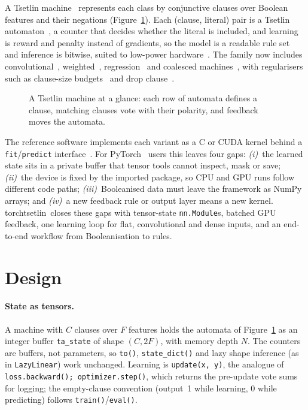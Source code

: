 \documentclass[twoside,11pt]{article}
\newcommand{\code}[1]{\texttt{#1}}
\newcommand{\lib}{\textsf{torchtsetlin}}
\begin{document}
A Tsetlin machine~\citep[TM;][]{granmo2018tsetlin} represents each class by conjunctive
clauses over Boolean features and their negations (Figure~\ref{fig:tm}). Each (clause, literal) pair is a Tsetlin
automaton~\citep{tsetlin1961,narendra1989learning}, a counter that decides whether the literal
is included, and learning is reward and penalty instead of gradients, so the model is a readable rule set~\citep{rudin2019stop} and inference is bitwise, suited to
low-power hardware~\citep{wheeldon2020asynchronous,maheshwari2023redress,tsetlinkws2025}.
The family now includes convolutional~\citep{granmo2019convolutional},
weighted~\citep{phoulady2019weighted}, regression~\citep{abeyrathna2020regression} and coalesced
machines~\citep{glimsdal2021coalesced}, with regularisers such as clause-size
budgets~\citep{abeyrathna2023clausesize} and drop clause~\citep{sharma2023dropclause}.

\begin{figure}[t]
\centering

\caption{A Tsetlin machine at a glance: each row of automata defines a clause, matching
  clauses vote with their polarity, and feedback moves the automata.}
\label{fig:tm}
\end{figure}

The reference software implements each variant as a C or CUDA kernel behind a
\code{fit}/\code{predict} interface~\citep{software_pytsetlinmachine,
software_pytsetlinmachinecuda,software_tmu}. For PyTorch~\citep{paszke2019pytorch} users this
leaves four gaps:
\emph{(i)}~the learned state sits in a private buffer that tensor tools cannot inspect, mask or
save; \emph{(ii)}~the device is fixed by the imported package, so CPU and GPU runs follow
different code paths; \emph{(iii)}~Booleanised data must leave the framework as NumPy arrays;
and \emph{(iv)}~a new feedback rule or output layer means a new kernel. \lib\ closes these gaps
with tensor-state \code{nn.Module}s, batched GPU feedback, one learning loop for flat,
convolutional and dense inputs, and an end-to-end workflow from Booleanisation to rules.

\section{Design}
\label{sec:design}

\paragraph{State as tensors.}
A machine with $C$ clauses over $F$ features holds the automata of Figure~\ref{fig:tm} as an
integer buffer \code{ta\_state} of shape $(C, 2F)$, with memory depth $N$.
The counters are buffers, not parameters, so \code{to()}, \code{state\_dict()} and lazy shape
inference (as in \code{LazyLinear}) work unchanged. Learning is \code{update(x, y)}, the analogue
of \code{loss.backward(); optimizer.step()}, which returns the pre-update vote sums for logging;
the empty-clause convention (output~1 while learning, 0 while predicting) follows
\code{train()}/\code{eval()}.
\end{document}
